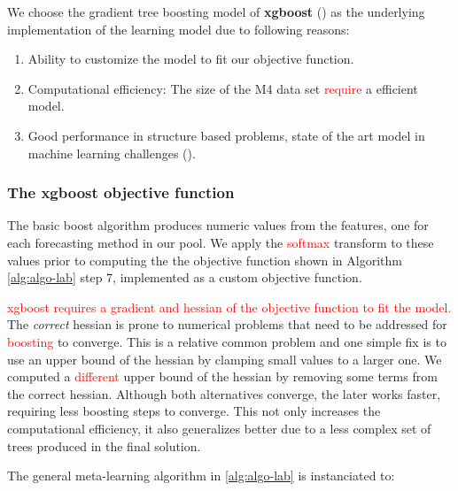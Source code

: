 \documentclass[11pt,a4paper,]{article}
\providecommand{\tightlist}{%
  \setlength{\itemsep}{0pt}\setlength{\parskip}{0pt}}
\theoremstyle{definition}
\theoremstyle{definition}
\theoremstyle{definition}
\theoremstyle{remark}
\begin{document}
We choose the gradient tree boosting model of \textbf{xgboost}
(\textcite{chen2016xgboost}) as the underlying implementation of the
learning model due to following reasons:

\begin{enumerate}
\def\labelenumi{\arabic{enumi}.}
\tightlist
\item
  Ability to customize the model to fit our objective function.
\item
  Computational efficiency: The size of the M4 data set
  \textcolor{red}{require} a efficient model.
\item
  Good performance in structure based problems, state of the art model
  in machine learning challenges (\textcite{chen2016xgboost}).
\end{enumerate}

\subsubsection{The xgboost objective
function}\label{the-xgboost-objective-function}

The basic boost algorithm produces numeric values from the features, one
for each forecasting method in our pool. We apply the
\textcolor{red}{softmax} transform to these values prior to computing
the the objective function shown in Algorithm \ref{alg:algo-lab} step 7,
implemented as a custom objective function.

\textcolor{red}{xgboost requires a gradient and hessian of the objective function to fit the model.}
The \emph{correct} hessian is prone to numerical problems that need to
be addressed for \textcolor{red}{boosting} to converge. This is a
relative common problem and one simple fix is to use an upper bound of
the hessian by clamping small values to a larger one. We computed a
\textcolor{red}{different} upper bound of the hessian by removing some
terms from the correct hessian. Although both alternatives converge, the
later works faster, requiring less boosting steps to converge. This not
only increases the computational efficiency, it also generalizes better
due to a less complex set of trees produced in the final solution.

The general meta-learning algorithm in \ref{alg:algo-lab} is
instanciated to:
\end{document}
